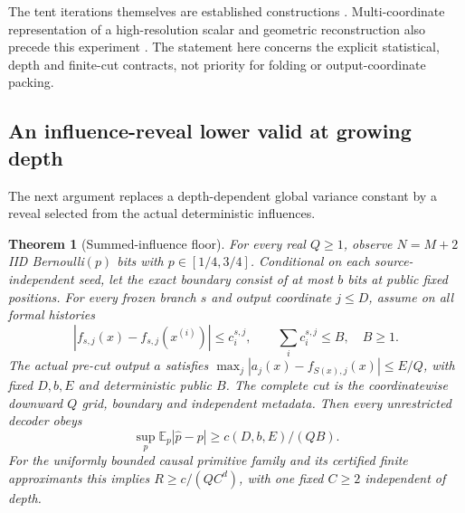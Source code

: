 \documentclass[11pt,letterpaper]{article}
\newtheorem{theorem}{Theorem}[section]
\theoremstyle{definition}\newtheorem{definition}[theorem]{Definition}
\theoremstyle{remark}\newtheorem{remark}[theorem]{Remark}
\newcommand{\E}{\mathbb{E}}
\begin{document}
The tent iterations themselves are established constructions \citep[Section 3.3]{telgarsky2016}. Multi-coordinate representation of a high-resolution scalar and geometric reconstruction also precede this experiment \citep[Sections 2.1--2.4 of the cited version]{uss2025}. The statement here concerns the explicit statistical, depth and finite-cut contracts, not priority for folding or output-coordinate packing.

\subsection{An influence-reveal lower valid at growing depth}
The next argument replaces a depth-dependent global variance constant by a reveal selected from the actual deterministic influences.
\begin{theorem}[Summed-influence floor]\label{thm:iiddepth}
For every real $Q\ge1$, observe $N=M+2$ IID Bernoulli$(p)$ bits with $p\in[1/4,3/4]$. Conditional on each source-independent seed, let the exact boundary consist of at most $b$ bits at public fixed positions. For every frozen branch $s$ and output coordinate $j\le D$, assume on all formal histories
\[
 |f_{s,j}(x)-f_{s,j}(x^{(i)})|\le c_i^{s,j},\qquad
 \sum_i c_i^{s,j}\le B,\quad B\ge1.
\]
The actual pre-cut output $a$ satisfies
$\max_j|a_j(x)-f_{S(x),j}(x)|\le E/Q$, with fixed $D,b,E$ and deterministic public $B$. The complete cut is the coordinatewise downward $Q$ grid, boundary and independent metadata. Then every unrestricted decoder obeys
\[
 \sup_p\E_p|\widehat p-p|\ge c(D,b,E)/(QB).
\]
For the uniformly bounded causal primitive family and its certified finite approximants this implies $R\ge c/(QC^d)$, with one fixed $C\ge2$ independent of depth.
\end{theorem}
\end{document}
